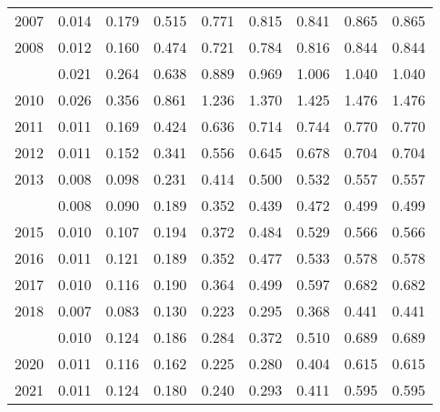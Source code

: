 \documentclass[
]{article}
\begin{document}
\begin{longtable}[t]{lrrrrrrrr}
2007 & 0.014 & 0.179 & 0.515 & 0.771 & 0.815 & 0.841 & 0.865 & 0.865\\
2008 & 0.012 & 0.160 & 0.474 & 0.721 & 0.784 & 0.816 & 0.844 & 0.844\\
\addlinespace
2009 & 0.021 & 0.264 & 0.638 & 0.889 & 0.969 & 1.006 & 1.040 & 1.040\\
2010 & 0.026 & 0.356 & 0.861 & 1.236 & 1.370 & 1.425 & 1.476 & 1.476\\
2011 & 0.011 & 0.169 & 0.424 & 0.636 & 0.714 & 0.744 & 0.770 & 0.770\\
2012 & 0.011 & 0.152 & 0.341 & 0.556 & 0.645 & 0.678 & 0.704 & 0.704\\
2013 & 0.008 & 0.098 & 0.231 & 0.414 & 0.500 & 0.532 & 0.557 & 0.557\\
\addlinespace
2014 & 0.008 & 0.090 & 0.189 & 0.352 & 0.439 & 0.472 & 0.499 & 0.499\\
2015 & 0.010 & 0.107 & 0.194 & 0.372 & 0.484 & 0.529 & 0.566 & 0.566\\
2016 & 0.011 & 0.121 & 0.189 & 0.352 & 0.477 & 0.533 & 0.578 & 0.578\\
2017 & 0.010 & 0.116 & 0.190 & 0.364 & 0.499 & 0.597 & 0.682 & 0.682\\
2018 & 0.007 & 0.083 & 0.130 & 0.223 & 0.295 & 0.368 & 0.441 & 0.441\\
\addlinespace
2019 & 0.010 & 0.124 & 0.186 & 0.284 & 0.372 & 0.510 & 0.689 & 0.689\\
2020 & 0.011 & 0.116 & 0.162 & 0.225 & 0.280 & 0.404 & 0.615 & 0.615\\
2021 & 0.011 & 0.124 & 0.180 & 0.240 & 0.293 & 0.411 & 0.595 & 0.595\\*
\end{longtable}
\end{document}
